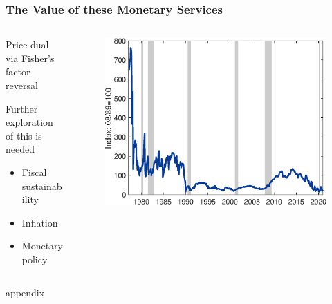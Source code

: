 \documentclass[11pt, handout, aspectratio=169]{beamer}
\newenvironment{wideitemize}{\itemize\addtolength{\itemsep}{10pt}}{\enditemize}
\begin{document}
\begin{frame}
\frametitle{The Value of these Monetary Services}
\begin{columns}
	\begin{column}{.45\textwidth}
		\begin{wideitemize}
			\item Price dual via Fisher's factor reversal
			\item Further exploration of this is needed
			\begin{itemize}
				\item Fiscal sustainability
				\item Inflation
				\item Monetary policy
			\end{itemize}
		\end{wideitemize}
	\end{column}
	\begin{column}{.55\textwidth}
		\begin{figure}[p]
			\centering
			\includegraphics[width=\textwidth]{../Figures/FiscalCapacity_Index.eps}
		\end{figure}
	\end{column}
\end{columns}
\end{frame}

\appendix

\begin{frame}
	appendix 
\end{frame}
	
\end{document}
